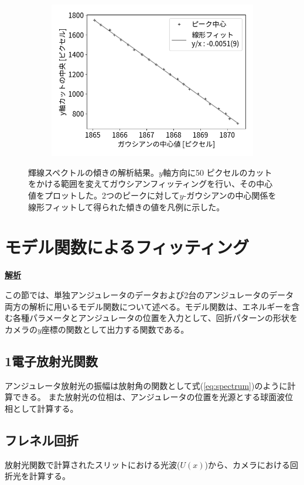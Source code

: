 \documentclass[a4paper,11pt,uplatex]{jsbook}
\begin{document}
\begin{figure}[h]
\begin{subfigure}[h]{0.3\linewidth}
  \end{subfigure}
  \hfill
  \begin{subfigure}[h]{0.3\linewidth}
    \centering
    \includegraphics[width=\linewidth]{image/4-tiltspeak.png}
  \end{subfigure}
  \caption[水銀灯の波長較正-3]{輝線スペクトルの傾きの解析結果。$y$軸方向に50 ピクセルのカットをかける範囲を変えてガウシアンフィッティングを行い、その中心値をプロットした。2つのピークに対して$y$-ガウシアンの中心関係を線形フィットして得られた傾きの値を凡例に示した。}\label{tiltfit}
\end{figure}

\section{モデル関数によるフィッティング}
\noindent \textbf{\underline{解析}}\par
この節では、単独アンジュレータのデータおよび2台のアンジュレータのデータ両方の解析に用いるモデル関数について述べる。モデル関数は、エネルギーを含む各種パラメータとアンジュレータの位置を入力として、回折パターンの形状をカメラの$y$座標の関数として出力する関数である。
\subsection{1電子放射光関数}
アンジュレータ放射光の振幅は放射角の関数として式(\ref{eq:spectrum})のように計算できる。
また放射光の位相は、アンジュレータの位置を光源とする球面波位相として計算する。
\subsection{フレネル回折}
放射光関数で計算されたスリットにおける光波($U(x)$)から、カメラにおける回折光を計算する。
\end{document}
